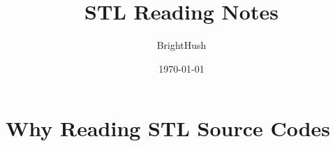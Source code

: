 \documentclass[UTF8]{ctexart}
\title{STL Reading Notes}
\author{BrightHush}
\date{\today}
\begin{document}
\maketitle
\tableofcontents

\newcommand{\figref}[1]{\figurename~\ref{#1}}

\section{Why Reading STL Source Codes}
\end{document}
